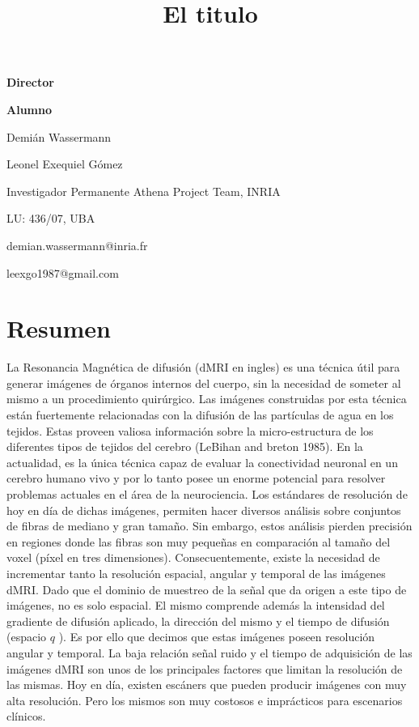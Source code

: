 \documentclass[a4paper,10pt]{article}
\title{El titulo}
\newcommand\textline[3][t]{%
  \par\smallskip\noindent\parbox[#1]{.658\textwidth}
  {\raggedright#2}%
  \parbox[#1]{.333\textwidth}{\raggedleft#3}%
}
\begin{document}
{
\textline[t]{\textbf{Director}}{\textbf{Alumno}}
\textline[t]{Demián Wassermann}{Leonel Exequiel G\'omez}
\textline[t]{Investigador Permanente Athena Project Team, INRIA}{LU: 436/07, UBA}
\textline[t]{demian.wassermann@inria.fr}{leexgo1987@gmail.com}
}


\section*{Resumen}


La Resonancia Magnética de difusión (dMRI en ingles) es una técnica útil para generar imágenes de 
órganos internos del cuerpo, sin la necesidad de someter al mismo a un procedimiento quirúrgico. Las imágenes 
construidas por esta técnica están fuertemente relacionadas con la difusión de las partículas de agua en los tejidos. 
Estas proveen valiosa información sobre la micro-estructura de los diferentes tipos de tejidos del cerebro 
(LeBihan and breton 1985). En la actualidad, es la única técnica capaz de evaluar 
la conectividad neuronal en un cerebro humano vivo y por lo tanto posee un enorme potencial para resolver problemas 
actuales en el área de la neurociencia. Los estándares de resolución de hoy en día de dichas imágenes, permiten hacer 
diversos análisis sobre conjuntos de fibras de mediano y gran tamaño. Sin embargo, estos análisis 
pierden precisión en regiones donde las fibras son muy pequeñas en comparación al tamaño del voxel (píxel en tres 
dimensiones). Consecuentemente, existe la necesidad de incrementar tanto la resolución espacial, angular y temporal de 
las imágenes dMRI. Dado que el dominio de muestreo de la señal que da origen a este tipo de imágenes, no es solo 
espacial. El mismo comprende además la intensidad del gradiente de difusión aplicado, la dirección del mismo y el 
tiempo de difusión (espacio $q$ \citep{CALLAGHAN1990177}). Es por ello que decimos que estas imágenes poseen resolución 
angular y temporal. La baja relaci\'on se\~nal ruido y el tiempo de adquisici\'on de las imágenes dMRI son unos de los 
principales factores que limitan la resolución de las mismas. %
Hoy en día, existen escáners que pueden 
producir imágenes con muy alta resolución. Pero los mismos son muy costosos e 
imprácticos para escenarios clínicos.
\end{document}

